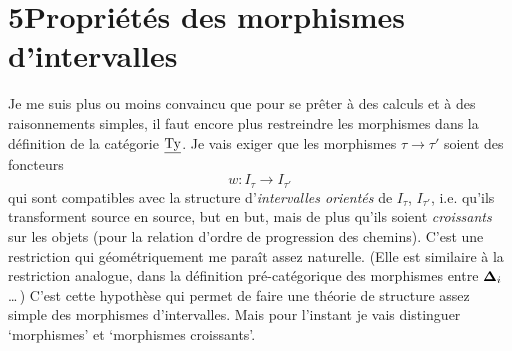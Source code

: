 
\section*{5\quad Propriétés des morphismes d'intervalles}

Je me suis plus ou moins convaincu que pour se prêter à des calculs et à des raisonnements simples, il faut encore plus restreindre les morphismes dans la définition de la catégorie $\underline{\mathrm{Ty}}$. Je vais exiger que les morphismes $\tau\longrightarrow\tau'$ soient des foncteurs
\[
w : I_\tau\longrightarrow I_{\tau'}
\]
qui sont compatibles avec la structure d'\textit{intervalles orientés} de $I_\tau$, $I_{\tau'}$, i.e. qu'ils transforment source en source, but en but, mais de plus qu'ils soient \textit{croissants} sur les objets (pour la relation d'ordre de progression des chemins). C'est une restriction qui géométriquement me paraît assez naturelle. (Elle est similaire à la restriction analogue, dans la définition pré-catégorique des morphismes entre $\boldsymbol{\Delta}_i$ \ldots\,) C'est cette hypothèse qui permet de faire une théorie de structure assez simple des morphismes d'intervalles. Mais pour l'instant je vais distinguer `morphismes' et `morphismes croissants'.

